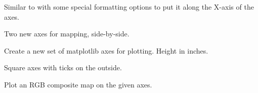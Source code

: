 \documentclass[letterpaper,10pt,english]{sphinxmanual}
\begin{document}

\begin{fulllineitems}
\label{\detokenize{xanespy:xanespy.plots.draw_histogram_colorbar}}
Similar to  with some special formatting options
to put it along the X-axis of the axes.

\end{fulllineitems}


\begin{fulllineitems}
\label{\detokenize{xanespy:xanespy.plots.dual_axes}}
Two new axes for mapping, side-by-side.

\end{fulllineitems}


\begin{fulllineitems}
\label{\detokenize{xanespy:xanespy.plots.new_axes}}
Create a new set of matplotlib axes for plotting. Height in inches.

\end{fulllineitems}


\begin{fulllineitems}
\label{\detokenize{xanespy:xanespy.plots.new_image_axes}}
Square axes with ticks on the outside.

\end{fulllineitems}


\begin{fulllineitems}
\label{\detokenize{xanespy:xanespy.plots.plot_composite_map}}
Plot an RGB composite map on the given axes.

\end{fulllineitems}
\end{document}
